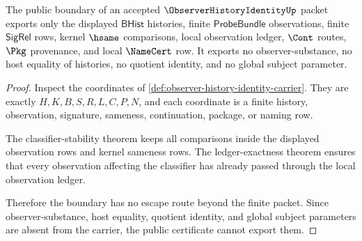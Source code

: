\begin{theorem}
\label{thm:observer-history-identity-non-escape-boundary}
The public boundary of an accepted $\ObserverHistoryIdentityUp$ packet exports only the displayed $\mathsf{BHist}$ histories, finite $\mathsf{ProbeBundle}$ observations, finite $\mathsf{SigRel}$ rows, kernel $\hsame$ comparisons, local observation ledger, $\Cont$ routes, $\Pkg$ provenance, and local $\NameCert$ row. It exports no observer-substance, no host equality of histories, no quotient identity, and no global subject parameter.
\end{theorem}
\begin{proof}
Inspect the coordinates of \autoref{def:observer-history-identity-carrier}. They are exactly $H,K,B,S,R,L,C,P,N$, and each coordinate is a finite history, observation, signature, sameness, continuation, package, or naming row.

The classifier-stability theorem keeps all comparisons inside the displayed observation rows and kernel sameness rows. The ledger-exactness theorem ensures that every observation affecting the classifier has already passed through the local observation ledger.

Therefore the boundary has no escape route beyond the finite packet. Since observer-substance, host equality, quotient identity, and global subject parameters are absent from the carrier, the public certificate cannot export them.
\end{proof}

